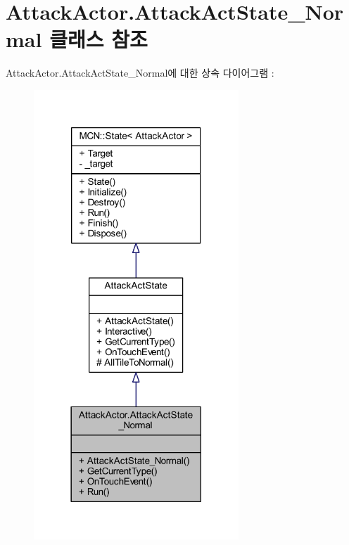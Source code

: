 \hypertarget{class_attack_actor_1_1_attack_act_state___normal}{}\section{Attack\+Actor.\+Attack\+Act\+State\+\_\+\+Normal 클래스 참조}
\label{class_attack_actor_1_1_attack_act_state___normal}


Attack\+Actor.\+Attack\+Act\+State\+\_\+\+Normal에 대한 상속 다이어그램 \+: 
\nopagebreak
\begin{figure}[H]
\begin{center}
\leavevmode
\includegraphics[width=218pt]{class_attack_actor_1_1_attack_act_state___normal__inherit__graph}
\end{center}
\end{figure}


